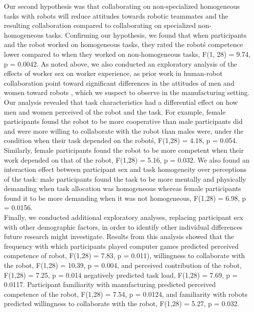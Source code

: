 Our second hypothesis was that collaborating on non-specialized homogeneous tasks with robots will reduce attitudes towards robotic teammates and the resulting collaboration compared to collaborating on specialized non-homogeneous tasks. Confirming our hypothesis, we found that when participants and the robot worked on homogeneous tasks, they rated the robot\' s competence lower compared to when they worked on non-homogeneous tasks, F(1, 28) = 9.74, p = 0.0042. 
       As noted above, we also conducted an exploratory analysis of the effects of worker sex on worker experience, as prior work in human-robot collaboration point toward significant differences in the attitudes of men and women toward robots \cite{schermerhorn2008robot}, which we suspect to observe in the manufacturing setting. Our analysis revealed that task characteristics had a differential effect on how men and women perceived of the robot and the task. For example, female participants found the robot to be more cooperative than male participants did and were more willing to collaborate with the robot than males were, under the condition when their task depended on the robot\' s, F(1,28) = 4.18, p = 0.054. Similarly, female participants found the robot to be more competent when their work depended on that of the robot, F(1,28) = 5.16, p = 0.032. We also found an interaction effect between participant sex and task homogeneity over perceptions of the task: male participants found the task to be more mentally and physically demanding when task allocation was homogeneous whereas female participants found it to be more demanding when it was not homogeneous, F(1,28) = 6.98, p = 0.0156.\\
       Finally, we conducted additional exploratory analyses, replacing participant sex with other demographic factors, in order to identify other individual differences future research might investigate. Results from this analysis showed that the frequency with which participants played computer games predicted perceived competence of robot, F(1,28) = 7.83, p = 0.011), willingness to collaborate with the robot, F(1,28) = 10.39, p = 0.004, and perceived contribution of the robot, F(1,28) = 7.25, p = 0.014 negatively predicted task load, F(1,28) = 7.69, p = 0.0117. Participant familiarity with manufacturing predicted perceived competence of the robot, F(1,28) = 7.54, p = 0.0124, and familiarity with robots predicted willingness to collaborate with the robot, F(1,28) = 5.27, p = 0.032.